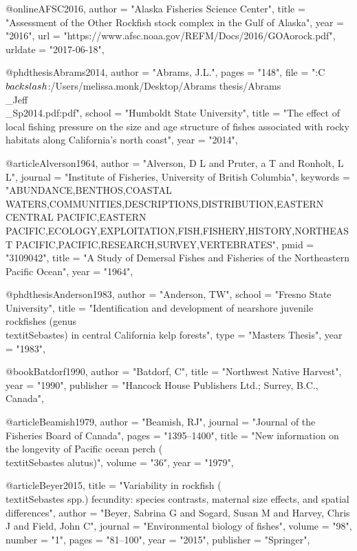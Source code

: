 @online{AFSC2016,
    author = "{Alaska Fisheries Science Center}",
    title = "{{Assessment of the Other Rockfish stock complex in the Gulf of Alaska}}",
    year = "2016",
    url = "{https://www.afsc.noaa.gov/REFM/Docs/2016/GOAorock.pdf}",
    urldate = "{2017-06-18}",
}

@phdthesis{Abrams2014,
    author = "{Abrams, J.L.}",
    pages = "{148}",
    file = "{:C$\\backslash$:/Users/melissa.monk/Desktop/Abrams thesis/Abrams\\_Jeff\\_Sp2014.pdf:pdf}",
    school = "{Humboldt State University}",
    title = "{{The effect of local fishing pressure on the size and age structure of fishes associated with rocky habitats along California's north coast}}",
    year = "{2014}",
}

@article{Alverson1964,
    author = "{Alverson, D L and Pruter, a T and Ronholt, L L}",
    journal = "{Institute of Fisheries, University of British Columbia}",
    keywords = "{ABUNDANCE,BENTHOS,COASTAL WATERS,COMMUNITIES,DESCRIPTIONS,DISTRIBUTION,EASTERN CENTRAL PACIFIC,EASTERN PACIFIC,ECOLOGY,EXPLOITATION,FISH,FISHERY,HISTORY,NORTHEAST PACIFIC,PACIFIC,RESEARCH,SURVEY,VERTEBRATES}",
    pmid = "{3109042}",
    title = "{{A Study of Demersal Fishes and Fisheries of the Northeastern Pacific Ocean}}",
    year = "{1964}",
}

@phdthesis{Anderson1983,
    author = "{Anderson, TW}",
    school = "{Fresno State University}",
    title = "{{Identification and development of nearshore juvenile rockfishes (genus \\textit{{Sebastes}}) in central California kelp forests}}",
    type = "{Masters Thesis}",
    year = "{1983}",
}

@book{Batdorf1990,
    author = "{Batdorf, C}",
    title = "{Northwest Native Harvest}",
    year = "{1990}",
    publisher = "{Hancock House Publishers Ltd.; Surrey, B.C., Canada}",
}


@article{Beamish1979,
    author = "{Beamish, RJ}",
    journal = "{Journal of the Fisheries Board of Canada}",
    pages = "{1395--1400}",
    title = "{{New information on the longevity of Pacific ocean perch (\\textit{{Sebastes} alutus})}}",
    volume = "{36}",
    year = "{1979}",
}

@article{Beyer2015,
    title = "{Variability in rockfish (\\textit{{Sebastes}} spp.) fecundity: species contrasts, maternal size effects, and spatial differences}",
    author = "{Beyer, Sabrina G and Sogard, Susan M and Harvey, Chris J and Field, John C}",
    journal = "{Environmental biology of fishes}",
    volume = "{98}",
    number = "{1}",
    pages = "{81--100}",
    year = "{2015}",
    publisher = "{Springer}",
}

